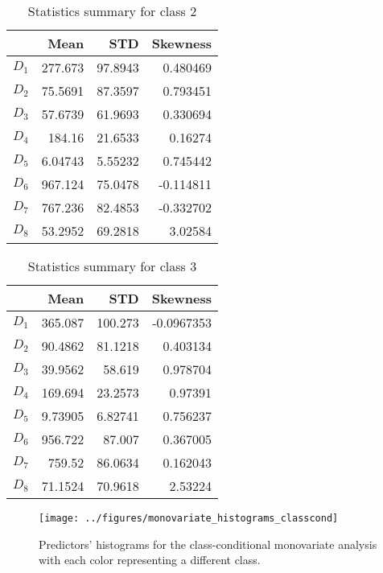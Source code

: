 \documentclass[conference]{IEEEtran}
\begin{document}
  \begin{table}[htp]
    \caption{Statistics summary for class 2}
      \centering
      \begin{tabular}{@{} crrr @{}}
        \toprule
         & Mean & STD & Skewness \\ 
        \midrule
        $D_1$ & 277.673  &  97.8943  &  0.480469 \\ 
        $D_2$ & 75.5691 &  87.3597  &  0.793451\\ 
        $D_3$ & 57.6739 &  61.9693  &  0.330694 \\ 
        $D_4$ & 184.16   &  21.6533 &   0.16274 \\ 
        $D_5$ & 6.04743  & 5.55232  & 0.745442 \\ 
        $D_6$ & 967.124 &   75.0478  & -0.114811 \\ 
        $D_7$ & 767.236  &  82.4853 &  -0.332702 \\ 
        $D_8$ & 53.2952  & 69.2818  &  3.02584 \\       
        \bottomrule
      \end{tabular}
    \label{statistics_table_class_2}
    \end{table}%

    \begin{table}[htp]
      \caption{Statistics summary for class 3}
        \centering
        \begin{tabular}{@{} crrr @{}}
          \toprule
           & Mean & STD & Skewness \\ 
          \midrule
          $D_1$ & 365.087  &  100.273  &  -0.0967353 \\ 
          $D_2$ & 90.4862  &  81.1218  &  0.403134 \\ 
          $D_3$ & 39.9562 &   58.619   &  0.978704 \\ 
          $D_4$ & 169.694  &   23.2573  &  0.97391 \\ 
          $D_5$ & 9.73905  &  6.82741  & 0.756237 \\ 
          $D_6$ & 956.722   &  87.007  &   0.367005 \\ 
          $D_7$ & 759.52   &   86.0634  &  0.162043 \\ 
          $D_8$ & 71.1524   & 70.9618  &  2.53224 \\       
          \bottomrule
        \end{tabular}
      \label{statistics_table_class_3}
      \end{table}%


\begin{figure}[htbp]
\centerline{\texttt{[image: ../figures/monovariate\_histograms\_classcond]}}
\caption{Predictors' histograms for the class-conditional monovariate analysis with each color representing a different class.}
\label{classcond_monovariate}
\end{figure}
\end{document}
